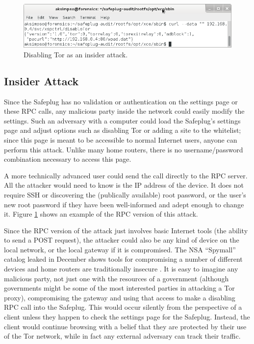 \documentclass[conference]{IEEEtran}
\begin{document}
\begin{figure}
  \centering
  \includegraphics[width=.75\textwidth]{disabletor}
  \caption{Disabling Tor as an insider attack.}
  \label{disable}
\end{figure}

\subsection{Insider Attack}
Since the Safeplug has no validation or authentication on the settings page or these RPC calls, any malicious party inside the network could easily modify the settings.  Such an adversary with a computer could load the Safeplug's settings page and adjust options such as disabling Tor or adding a site to the whitelist; since this page is meant to be accessible to normal Internet users, anyone can perform this attack.  Unlike many home routers, there is no username/password combination necessary to access this page.  

A more technically advanced user could send the call directly to the RPC server.  All the attacker would need to know is the IP address of the device.  It does not require SSH or discovering the (publically available) root password, or the user's new root password if they have been well-informed and adept enough to change it.  Figure \ref{disable} shows an example of the RPC version of this attack.

Since the RPC version of the attack just involves basic Internet tools (the ability to send a POST request), the attacker could also be any kind of device on the local network, or the local gateway if it is compromised.  The NSA ``Spymall'' catalog leaked in December shows tools for compromising a number of different devices and home routers are traditionally insecure \cite{spymall}.  It is easy to imagine any malicious party, not just one with the resources of a government (although governments might be some of the most interested parties in attacking a Tor proxy), compromising the gateway and using that access to make a disabling RPC call into the Safeplug.  This would occur silently from the perspective of a client unless they happen to check the settings page for the Safeplug.  Instead, the client would continue browsing with a belief that they are protected by their use of the Tor network, while in fact any external adversary can track their traffic.
\end{document}

